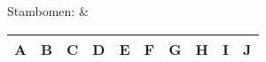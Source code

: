Stambomen: &
\begin{tabular}{|c|c|c|c|c|c|c|c|c|c|}
	\hline 
	\textbf{A} & \textbf{B} & \textbf{C} & \textbf{D} & \textbf{E} & \textbf{F} & \textbf{G} & \textbf{H} & \textbf{I} & \textbf{J} \\
	\hline 
\end{tabular} \\